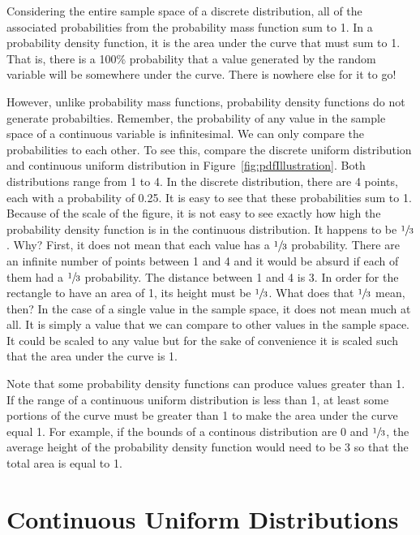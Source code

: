 \documentclass[nohyper,justified,marginals=raggedright]{tufte-book}\usepackage[]{graphicx}\usepackage[]{color}
\begin{document}
Considering the entire sample space of a discrete distribution, all of the associated probabilities from the probability mass function sum to 1. In a probability density function, it is the area under the curve that must sum to 1. That is, there is a 100\% probability that a value generated by the random variable will be somewhere under the curve. There is nowhere else for it to go!

However, unlike probability mass functions, probability density functions do not generate probabilties. Remember, the probability of any value in the sample space of a continuous variable is infinitesimal. We can only compare the probabilities to each other. To see this, compare the discrete uniform distribution and continuous uniform distribution in Figure~\ref{fig:pdfIllustration}. Both distributions range from 1 to 4. In the discrete distribution, there are 4 points, each with a probability of 0.25. It is easy to see that these probabilities sum to 1. Because of the scale of the figure, it is not easy to see exactly how high the probability density function is in the continuous distribution. It happens to be $\sfrac{1}{3}$. Why? First, it does not mean that each value has a $\sfrac{1}{3}$ probability. There are an infinite number of points between 1 and 4 and it would be absurd if each of them had a $\sfrac{1}{3}$ probability. The distance between 1 and 4 is 3. In order for the rectangle to have an area of 1, its height must be $\sfrac{1}{3}$. What does that $\sfrac{1}{3}$ mean, then? In the case of a single value in the sample space, it does not mean much at all. It is simply a value that we can compare to other values in the sample space. It could be scaled to any value but for the sake of convenience it is scaled such that the area under the curve is 1. 

Note that some probability density functions can produce values greater than 1. If the range of a continuous uniform distribution is less than 1, at least some portions of the curve must be greater than 1 to make the area under the curve equal 1. For example, if the bounds of a continous distribution are 0 and $\sfrac{1}{3}$, the average height of the probability density function would need to be 3 so that the total area is equal to 1.

\section{Continuous Uniform Distributions}\label{sec:Uniform}

\end{document}
